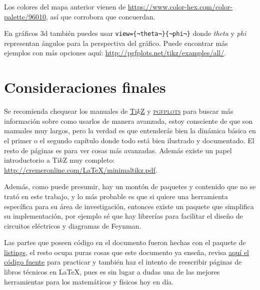 \documentclass[intro-breve-latex.tex]{subfiles}
\begin{document}
Los colores del mapa anterior vienen de \url{https://www.color-hex.com/color-palette/96010}, así que corrobora que concuerdan.

En gráficos 3d también puedes usar \lstinline|view={¬theta¬}{¬phi¬}| donde \textit{theta} y \textit{phi} representan ángulos para la perspectiva del gráfico. Puede encontrar más ejemplos con más opciones aquí: \url{http://pgfplots.net/tikz/examples/all/}.

\section{Consideraciones finales}
Se recomienda chequear los manuales de \href{http://mirrors.ctan.org/graphics/pgf/base/doc/pgfmanual.pdf}{Ti$k$Z} y
\href{https://ctan.dcc.uchile.cl/graphics/pgf/contrib/pgfplots/doc/pgfplots.pdf}{\textsc{pgfplots}} para buscar más
información sobre como usarlos de manera avanzada, estoy consciente de que son manuales muy largos, pero la verdad es
que entenderás bien la dinámica básica en el primer o el segundo capítulo donde todo está bien ilustrado y documentado.
El resto de páginas es para ver cosas más avanzadas. Además existe un papel introductorio a Ti$k$Z muy completo:
\url{http://cremeronline.com/LaTeX/minimaltikz.pdf}.

Además, como puede presumir, hay un montón de paquetes y contenido que no se trató en este trabajo, y lo más probable es
que si quiere una herramienta específica para su área de investigación, entonces existe un paquete que simplifica su
implementación, por ejemplo sé que hay librerías para facilitar el diseño de circuitos eléctricos y diagramas de
Feynman.

Las partes que poseen código en el documento fueron hechas con el paquete de
\href{http://texdoc.net/texmf-dist/doc/latex/listings/listings.pdf}{\ttfamily listings}, el resto ocupa puras cosas que
este documento ya enseña, revisa
\href{https://github.com/JoseCuevasBtos/apuntes-tex/blob/master/intro-breve-latex.tex}{\textcolor{newblue}{aquí} el
código fuente} para practicar y también haz el intento de reescribir páginas de libros técnicos en \LaTeX{}, pues es sin
lugar a dudas una de las mejores herramientas para los matemáticos y físicos hoy en día.
\end{document}
